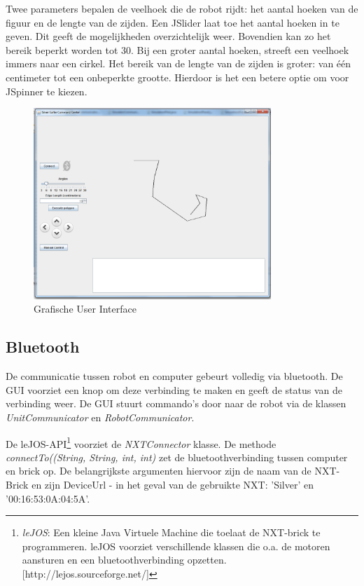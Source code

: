 \documentclass[tt1]{penoverslag}
\begin{document}
Twee parameters bepalen de veelhoek die de robot rijdt: het aantal hoeken van de figuur en de lengte van de zijden.
Een JSlider laat toe het aantal hoeken in te geven. Dit geeft de mogelijkheden overzichtelijk weer. Bovendien kan zo het bereik beperkt worden tot 30. Bij een groter aantal hoeken, streeft een veelhoek immers naar een cirkel.
Het bereik van de lengte van de zijden is groter: van \'e\'en centimeter tot een onbeperkte grootte. Hierdoor is het een betere optie om voor JSpinner te kiezen. 

\begin{figure}[tbp]
\begin{center}
    \includegraphics[width=0.8\textwidth]{GUI}
    \caption{Grafische User Interface}
	\label{fig:gui}
\end{center}
\end{figure}

\subsection{Bluetooth}
\label{ssec:bluetooth}
De communicatie tussen robot en computer gebeurt volledig via bluetooth. De GUI voorziet een knop om deze verbinding te maken en geeft de status van de verbinding weer. De GUI stuurt commando's door naar de robot via de klassen \textit{UnitCommunicator} en \textit{RobotCommunicator}.

De leJOS-API\footnote{\textit{leJOS}:  Een kleine Java Virtuele Machine die toelaat de NXT-brick te programmeren. leJOS voorziet verschillende klassen die o.a. de motoren aansturen en een bluetoothverbinding opzetten.  \mbox{[http://lejos.sourceforge.net/]}} voorziet de \textit{NXTConnector} klasse. De methode \textit{connectTo((String, String, int, int)} zet de bluetoothverbinding tussen computer en brick op. De belangrijkste argumenten hiervoor zijn de naam van de NXT-Brick en zijn DeviceUrl  - in het geval van de gebruikte NXT: 'Silver' en '00:16:53:0A:04:5A'.
\end{document}

